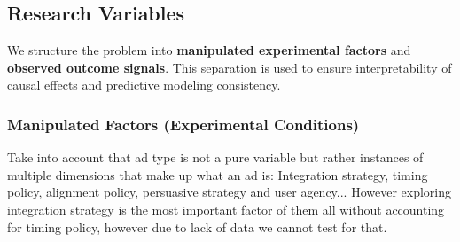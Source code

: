 \documentclass{article}
\begin{document}
\subsection{Research Variables}

We structure the problem into \textbf{manipulated experimental factors} and \textbf{observed outcome signals}. This separation is used to ensure interpretability of causal effects and predictive modeling consistency.

\subsubsection{Manipulated Factors (Experimental Conditions)}

Take into account that ad type is not a pure variable but rather instances of multiple dimensions that make up what an ad is: Integration strategy, timing policy, alignment policy, persuasive strategy and user agency... However exploring integration strategy is the most important factor of them all without accounting for timing policy, however due to lack of data we cannot test for that.
\end{document}
